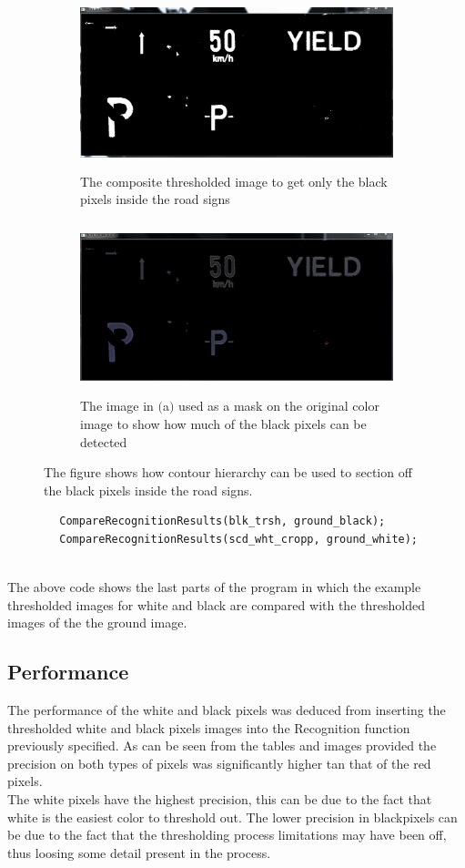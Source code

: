 \documentclass{article}
\begin{document}
\begin{figure}[H]
\begin{subfigure}{0.5\textwidth}
\includegraphics[width=0.9\linewidth, height=5cm]{N_BLK_TRSH.PNG} 
\caption{The composite thresholded image to get only the black pixels inside the road signs}
\label{fig:subim1}
\end{subfigure}
\begin{subfigure}{0.5\textwidth}
\includegraphics[width=0.9\linewidth, height=5cm]{N_BLK_CROPP.PNG}
\caption{The image in $($a$)$ used as a mask on the original color image to show how much of the black pixels can be detected}
\label{fig:subim2}
\end{subfigure}
\caption{The figure shows how contour hierarchy can be used to section off the black pixels inside the road signs.}
\label{fig:image2}
\end{figure}

\begin{lstlisting}
		CompareRecognitionResults(blk_trsh, ground_black);
		CompareRecognitionResults(scd_wht_cropp, ground_white);
		
\end{lstlisting}
The above code shows the last parts of the program in which the example thresholded images for white and black are compared with the thresholded images of the the ground image.
\subsection{Performance}\label{sec:intro}
The performance of the white and black pixels was deduced from inserting the thresholded white and black pixels images into the Recognition function previously specified. As can be seen from the tables and images provided the precision on both types of pixels was significantly higher tan that of the red pixels.\\
The white pixels have the highest precision, this can be due to the fact that white is the easiest color to threshold out. 
The lower precision in blackpixels can be due to the fact that the thresholding process limitations may have been off, thus loosing some detail present in the process.
\end{document}
